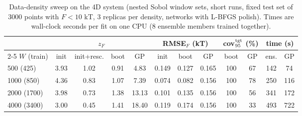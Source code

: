 \begin{table}
\caption{Data-density sweep on the 4D system (nested Sobol window sets, short runs, fixed test set of 3000 points with
$F<10$ kT, 3 replicas per density, networks with L-BFGS polish). Times are wall-clock seconds per fit on one CPU
(8 ensemble members trained together).}
\label{tab:density}
\begin{ruledtabular}
\begin{tabular}{lccccccccccc}
 & \multicolumn{4}{c}{$z_F$} & \multicolumn{3}{c}{RMSE$_F$ (kT)} & \multicolumn{2}{c}{cov$_{95}^{\rm tgt}$ (\%)} & \multicolumn{2}{c}{time (s)} \\
\cline{2-5}\cline{6-8}\cline{9-10}\cline{11-12}
$W$ (train) & init & init+resc. & boot & GP & init & boot & GP & boot & GP & ens. & GP \\
\hline
500 (425) & 3.93 & 1.02 & 0.91 & 4.83 & 0.149 & 0.127 & 0.165 & 100 & 67 & 142 & 74 \\
1000 (850) & 4.36 & 0.83 & 1.07 & 7.39 & 0.074 & 0.082 & 0.156 & 100 & 78 & 250 & 116 \\
2000 (1700) & 3.98 & 0.73 & 1.38 & 13.13 & 0.101 & 0.135 & 0.156 & 100 & 56 & 341 & 172 \\
4000 (3400) & 3.00 & 0.45 & 1.41 & 18.40 & 0.119 & 0.174 & 0.156 & 100 & 33 & 493 & 722 \\
\end{tabular}
\end{ruledtabular}
\end{table}
